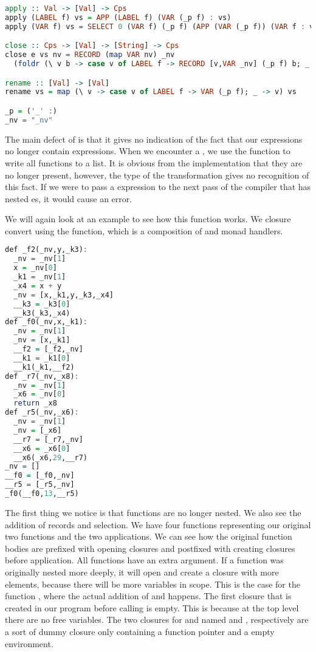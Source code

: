 {\begin{lstlisting}[language=Haskell]
apply :: Val -> [Val] -> Cps
apply (LABEL f) vs = APP (LABEL f) (VAR (_p f) : vs)
apply (VAR f) vs = SELECT 0 (VAR f) (_p f) (APP (VAR (_p f)) (VAR f : vs))

close :: Cps -> [Val] -> [String] -> Cps
close e vs nv = RECORD (map VAR nv) _nv
  (foldr (\ v b -> case v of LABEL f -> RECORD [v,VAR _nv] (_p f) b; _ -> b) e vs)

rename :: [Val] -> [Val]
rename vs = map (\ v -> case v of LABEL f -> VAR (_p f); _ -> v) vs

_p = ('_' :)
_nv = "_nv"
\end{lstlisting}

The main defect of  is that it gives no indication of the fact that our  expressions no longer contain  expressions. When we encounter a , we use the  function to write all functions to a list. It is obvious from the implementation that they are no longer present, however, the type of the transformation gives no recognition of this fact. If we were to pass a  expression to the next pass of the compiler that has nested es, it would cause an error.

We will again look at an example to see how this function works. We closure convert  using the  function, which is a composition of  and monad handlers.

\begin{lstlisting}[language=Haskell]
def _f2(_nv,y,_k3):
  _nv = _nv[1]
  x = _nv[0]
  _k1 = _nv[1]
  _x4 = x + y
  _nv = [x,_k1,y,_k3,_x4]
  __k3 = _k3[0]
  __k3(_k3,_x4)
def _f0(_nv,x,_k1):
  _nv = _nv[1]
  _nv = [x,_k1]
  __f2 = [_f2,_nv]
  __k1 = _k1[0]
  __k1(_k1,__f2)
def _r7(_nv,_x8):
  _nv = _nv[1]
  _x6 = _nv[0]
  return _x8
def _r5(_nv,_x6):
  _nv = _nv[1]
  _nv = [_x6]
  __r7 = [_r7,_nv]
  __x6 = _x6[0]
  __x6(_x6,29,__r7)
_nv = []
__f0 = [_f0,_nv]
__r5 = [_r5,_nv]
_f0(__f0,13,__r5)
\end{lstlisting}

The first thing we notice is that functions are no longer nested. We also see the addition of records and selection. We have four functions representing our original two functions and the two applications. We can see how the original function bodies are prefixed with opening closures and postfixed with creating closures before application. All functions have an extra  argument. If a function was originally nested more deeply, it will open and create a closure with more elements, because there will be more variables in scope. This is the case for the function , where the actual addition of  and  happens. The first closure that is created in our program before calling  is empty. This is because at the top level there are no free variables. The two closures for  and  named  and , respectively are a sort of dummy closure only containing a function pointer and a empty environment.

}
